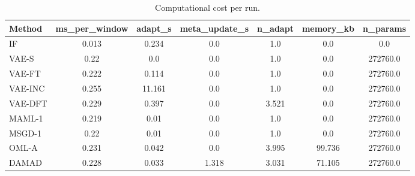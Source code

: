 \begin{table}[t]
\centering
\small
\caption{Computational cost per run.}
\label{tab:cost}
\begin{tabular}{lcccccc}
\toprule
Method & ms_per_window & adapt_s & meta_update_s & n_adapt & memory_kb & n_params \\
\midrule
IF & 0.013 & 0.234 & 0.0 & 1.0 & 0.0 & 0.0 \\
VAE-S & 0.22 & 0.0 & 0.0 & 1.0 & 0.0 & 272760.0 \\
VAE-FT & 0.222 & 0.114 & 0.0 & 1.0 & 0.0 & 272760.0 \\
VAE-INC & 0.255 & 11.161 & 0.0 & 1.0 & 0.0 & 272760.0 \\
VAE-DFT & 0.229 & 0.397 & 0.0 & 3.521 & 0.0 & 272760.0 \\
MAML-1 & 0.219 & 0.01 & 0.0 & 1.0 & 0.0 & 272760.0 \\
MSGD-1 & 0.22 & 0.01 & 0.0 & 1.0 & 0.0 & 272760.0 \\
OML-A & 0.231 & 0.042 & 0.0 & 3.995 & 99.736 & 272760.0 \\
DAMAD & 0.228 & 0.033 & 1.318 & 3.031 & 71.105 & 272760.0 \\
\bottomrule
\end{tabular}
\end{table}
